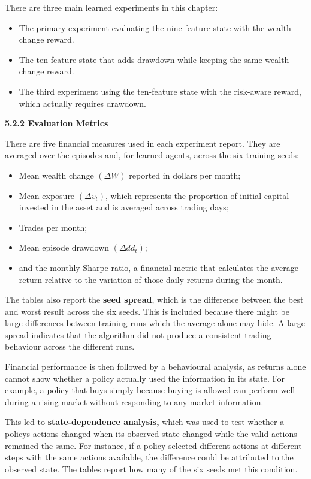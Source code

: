 There are three main learned experiments in this chapter:

\begin{itemize}
\item
  The primary experiment evaluating the nine-feature state with the
  wealth-change reward.
\item
  The ten-feature state that adds drawdown while keeping the same
  wealth-change reward.
\item
  The third experiment using the ten-feature state with the risk-aware
  reward, which actually requires drawdown.
\end{itemize}

\textbf{5.2.2 Evaluation Metrics}

There are five financial measures used in each experiment report. They
are averaged over the episodes and, for learned agents, across the six
training seeds:

\begin{itemize}
\item
  Mean wealth change \((\Delta W)\) reported in dollars per month;
\item
  Mean exposure \((\Delta v_{t})\), which represents the proportion of
  initial capital invested in the asset and is averaged across trading
  days;
\item
  Trades per month;
\item
  Mean episode drawdown \((\Delta{dd}_{t})\);
\item
  and the monthly Sharpe ratio, a financial metric that calculates the
  average return relative to the variation of those daily returns during
  the month.
\end{itemize}

The tables also report the \textbf{seed spread}, which is the difference
between the best and worst result across the six seeds. This is included
because there might be large differences between training runs which the
average alone may hide. A large spread indicates that the algorithm did
not produce a consistent trading behaviour across the different runs.

Financial performance is then followed by a behavioural analysis, as
returns alone cannot show whether a policy actually used the information
in its state. For example, a policy that buys simply because buying is
allowed can perform well during a rising market without responding to
any market information.

This led to \textbf{state-dependence analysis,} which was used to test
whether a policy\textquotesingle s actions changed when its observed
state changed while the valid actions remained the same. For instance,
if a policy selected different actions at different steps with the same
actions available, the difference could be attributed to the observed
state. The tables report how many of the six seeds met this condition.

